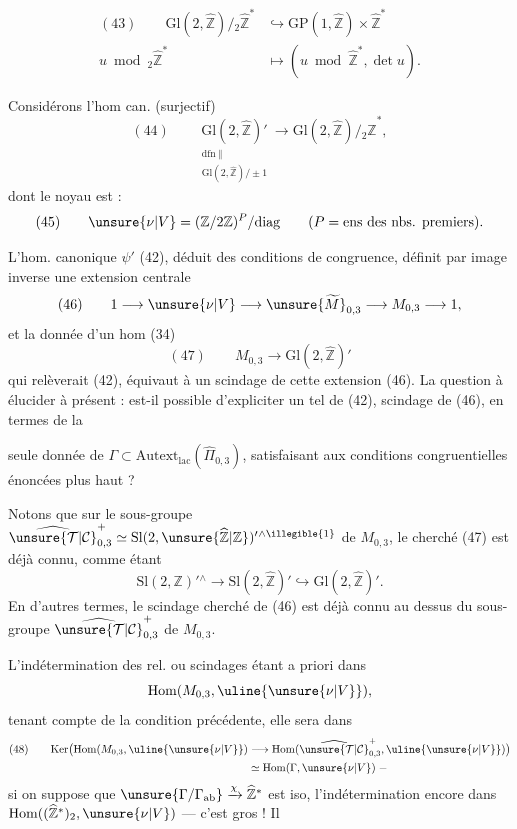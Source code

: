 
\[
\begin{aligned}
(43)\qquad
\mathrm{Gl}(2,\widehat{\mathbb Z})/{}_{2}\widehat{\mathbb Z}^{*}
&\hookrightarrow \mathrm{GP}(1,\widehat{\mathbb Z})\times\widehat{\mathbb Z}^{*}\\
u\bmod {}_{2}\widehat{\mathbb Z}^{*}
&\longmapsto (u\bmod\widehat{\mathbb Z}^{*},\det u).
\end{aligned}
\]

Considérons l'hom can. (surjectif)
\[
(44)\qquad
\underset{\substack{\mathrm{dfn}\;\Vert\\
\mathrm{Gl}(2,\widehat{\mathbb Z})/\pm1}}
{\mathrm{Gl}(2,\widehat{\mathbb Z})'}
\longrightarrow \mathrm{Gl}(2,\widehat{\mathbb Z})/{}_{2}\widehat{\mathbb Z}^{*},
\]
dont le noyau est  :
\[
(45)\qquad
\unsure{\nu|V}=(\mathbb Z/2\mathbb Z)^P/\mathrm{diag}
\qquad (P=\text{ens des nbs. premiers}).
\]

L'hom. canonique $\psi'$ (42), déduit des conditions de congruence,
définit par image inverse une extension centrale
\[
(46)\qquad
1\longrightarrow\unsure{\nu|V}\longrightarrow
\unsure{\widetilde{M}}_{0,3}\longrightarrow
M_{0,3}\longrightarrow1,
\]
et la donnée d'un hom (34)
\[
(47)\qquad
M_{0,3}\longrightarrow\mathrm{Gl}(2,\widehat{\mathbb Z})'
\]
qui relèverait (42), équivaut à un
scindage de cette extension (46). La question à élucider à présent :
est-il possible d'expliciter un tel  de
(42),  scindage de (46), en termes de la


seule donnée de $\Gamma\subset\mathrm{Autext}_{\mathrm{lac}}
(\widehat{\Pi}_{0,3})$, satisfaisant aux conditions congruentielles
énoncées plus haut ?

Notons que sur le sous-groupe
$\widehat{\unsure{\mathcal T|\mathcal C}}_{0,3}^{+}
\simeq \mathrm{Sl}(2,\unsure{\widehat{\mathbb Z}|\mathbb Z})'{}^{\wedge\illegible{1}}$
de $M_{0,3}$, le 
cherché (47) est déjà connu, comme étant
\[
\mathrm{Sl}(2,\mathbb Z)'{}^{\wedge}\longrightarrow
\mathrm{Sl}(2,\widehat{\mathbb Z})'\hookrightarrow
\mathrm{Gl}(2,\widehat{\mathbb Z})'.
\]
En d'autres termes, le scindage cherché de (46) est déjà connu au dessus
du sous-groupe $\widehat{\unsure{\mathcal T|\mathcal C}}_{0,3}^{+}$
de $M_{0,3}$.

L'indétermination des rel. ou scindages étant a priori dans
\[
\mathrm{Hom}(M_{0,3},\uline{\unsure{\nu|V}}),
\]
tenant compte de la condition précédente, elle sera dans
\[
\begin{aligned}
(48)\qquad
\mathrm{Ker}\bigl(\mathrm{Hom}(M_{0,3},\uline{\unsure{\nu|V}})
&\longrightarrow
\mathrm{Hom}(\widehat{\unsure{\mathcal T|\mathcal C}}_{0,3}^{+},
\uline{\unsure{\nu|V}})\bigr)\\
&\simeq\mathrm{Hom}(\Gamma,\unsure{\nu|V})\;-
\end{aligned}
\]
si on suppose que
$\unsure{\Gamma/\Gamma_{\mathrm{ab}}}\xrightarrow{\chi}\widehat{\mathbb Z}^{*}$
est iso, l'indétermination  encore dans
$\mathrm{Hom}((\widehat{\mathbb Z}^{*})_2,\unsure{\nu|V})$
--- c'est gros ! Il

